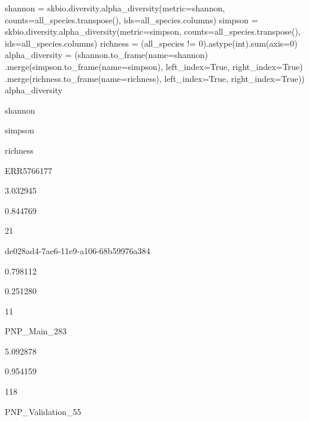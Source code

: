 \documentclass[
  letterpaper,
]{book}
\newenvironment{Shaded}{}{}
\newcommand{\BuiltInTok}[1]{\textcolor[rgb]{0.84,0.23,0.29}{#1}}
\newcommand{\DecValTok}[1]{\textcolor[rgb]{0.00,0.36,0.77}{#1}}
\newcommand{\NormalTok}[1]{\textcolor[rgb]{0.14,0.16,0.18}{#1}}
\newcommand{\OperatorTok}[1]{\textcolor[rgb]{0.14,0.16,0.18}{#1}}
\newcommand{\StringTok}[1]{\textcolor[rgb]{0.01,0.18,0.38}{#1}}
\newcommand{\VariableTok}[1]{\textcolor[rgb]{0.89,0.38,0.04}{#1}}
\begin{document}
\begin{Shaded}
\begin{Highlighting}[]
\NormalTok{shannon }\OperatorTok{=}\NormalTok{ skbio.diversity.alpha\_diversity(metric}\OperatorTok{=}\StringTok{\textquotesingle{}shannon\textquotesingle{}}\NormalTok{, counts}\OperatorTok{=}\NormalTok{all\_species.transpose(), ids}\OperatorTok{=}\NormalTok{all\_species.columns)}
\NormalTok{simpson }\OperatorTok{=}\NormalTok{ skbio.diversity.alpha\_diversity(metric}\OperatorTok{=}\StringTok{\textquotesingle{}simpson\textquotesingle{}}\NormalTok{, counts}\OperatorTok{=}\NormalTok{all\_species.transpose(), ids}\OperatorTok{=}\NormalTok{all\_species.columns)}
\NormalTok{richness }\OperatorTok{=}\NormalTok{ (all\_species }\OperatorTok{!=} \DecValTok{0}\NormalTok{).astype(}\BuiltInTok{int}\NormalTok{).}\BuiltInTok{sum}\NormalTok{(axis}\OperatorTok{=}\DecValTok{0}\NormalTok{)}
\NormalTok{alpha\_diversity }\OperatorTok{=}\NormalTok{ (shannon.to\_frame(name}\OperatorTok{=}\StringTok{\textquotesingle{}shannon\textquotesingle{}}\NormalTok{)}
\NormalTok{                   .merge(simpson.to\_frame(name}\OperatorTok{=}\StringTok{\textquotesingle{}simpson\textquotesingle{}}\NormalTok{), left\_index}\OperatorTok{=}\VariableTok{True}\NormalTok{, right\_index}\OperatorTok{=}\VariableTok{True}\NormalTok{)}
\NormalTok{                   .merge(richness.to\_frame(name}\OperatorTok{=}\StringTok{\textquotesingle{}richness\textquotesingle{}}\NormalTok{), left\_index}\OperatorTok{=}\VariableTok{True}\NormalTok{, right\_index}\OperatorTok{=}\VariableTok{True}\NormalTok{))}
\NormalTok{alpha\_diversity}
\end{Highlighting}
\end{Shaded}

shannon

simpson

richness

ERR5766177

3.032945

0.844769

21

de028ad4-7ae6-11e9-a106-68b59976a384

0.798112

0.251280

11

PNP\_Main\_283

5.092878

0.954159

118

PNP\_Validation\_55
\end{document}
